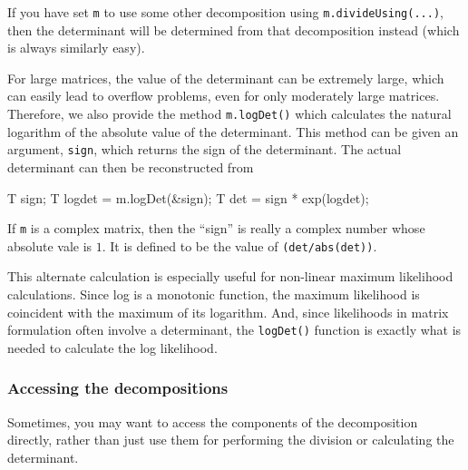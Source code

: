 \documentclass[twoside,letterpaper,11pt]{article}
\renewcommand{\tt}[1]{{\lstinline {#1}}}
\begin{document}
If you have set \tt{m} to use some other decomposition using 
\tt{m.divideUsing(...)},
then the determinant will be determined from that decomposition instead 
(which is always similarly easy).

For large matrices, the value of the determinant can be extremely large, which can easily
lead to overflow problems, even for only moderately large matrices.  Therefore, we
also provide the method \tt{m.logDet()} which calculates the natural logarithm of the
absolute value of the determinant.  This method can be given an argument, \tt{sign},
which returns the sign of the determinant.  The actual determinant can then be 
reconstructed from 
\begin{tmvcode}
T sign;
T logdet = m.logDet(&sign);
T det = sign * exp(logdet);
\end{tmvcode}
If \tt{m} is a complex matrix, then the ``sign'' is really a complex number whose 
absolute vale is $1$. It is defined to be the value of \tt{(det/abs(det))}.

This alternate calculation is especially useful for non-linear maximum likelihood
calculations.  Since log is a monotonic function, the maximum likelihood is coincident
with the maximum of its logarithm.  And, since likelihoods in matrix formulation
often involve a determinant,
the \tt{logDet()} function is exactly what is needed to calculate the log likelihood.

\subsubsection{Accessing the decompositions}
\label{Matrix_Division_Access}

Sometimes, you may want to access the components of the decomposition directly,
rather than just use them for performing the division or calculating the determinant.
\end{document}
